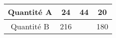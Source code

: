 \begin{tabular}{|c|c|c|c|}
\hline
Quantité A & 24 & 44 & 20 \\ \hline
Quantité B & 216 & \kern1cm & 180 \\ \hline
\end{tabular}

